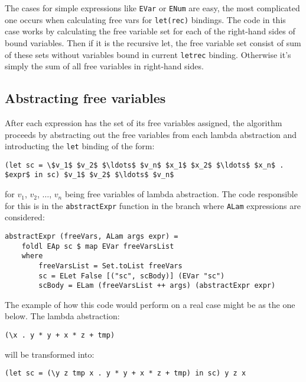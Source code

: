 \documentclass[12pt,a4paper]{report}
\begin{document}
The cases for simple expressions like \texttt{EVar} or \texttt{ENum} are easy,
the most complicated one occurs when calculating free vars for
\texttt{let(rec)} bindings. The code in this case works by calculating the free
variable set for each of the right-hand sides of bound variables. Then if it is
the recursive let, the free variable set consist of sum of these sets without
variables bound in current \texttt{letrec} binding. Otherwise it's simply the
sum of all free variables in right-hand sides.

\subsection{Abstracting free variables}
After each expression has the set of its free variables assigned, the algorithm
proceeds by abstracting out the free variables from each lambda abstraction and
introducting the \texttt{let} binding of the form:

\hspace*{-1.5in}
\begin{lstlisting}[style=haskell,mathescape=true]
(let sc = \$v_1$ $v_2$ $\ldots$ $v_n$ $x_1$ $x_2$ $\ldots$ $x_n$ . $expr$ in sc) $v_1$ $v_2$ $\ldots$ $v_n$
\end{lstlisting}

for $v_1$, $v_2$, $\ldots$, $v_n$ being free variables of lambda abstraction.
The code responsible for this is in the \texttt{abstractExpr} function in the
branch where \texttt{ALam} expressions are considered:

\hspace*{-1.5in}
\begin{lstlisting}[style=haskell]
abstractExpr (freeVars, ALam args expr) =
    foldl EAp sc $ map EVar freeVarsList
    where
        freeVarsList = Set.toList freeVars
        sc = ELet False [("sc", scBody)] (EVar "sc")
        scBody = ELam (freeVarsList ++ args) (abstractExpr expr)
\end{lstlisting}

The example of how this code would perform on a real case might be as the one
below. The lambda abstraction:

\hspace*{-1.5in}
\begin{lstlisting}[style=haskell]
(\x . y * y + x * z + tmp)
\end{lstlisting}

will be transformed into:

\hspace*{-1.5in}
\begin{lstlisting}[style=haskell]
(let sc = (\y z tmp x . y * y + x * z + tmp) in sc) y z x
\end{lstlisting}
\end{document}
